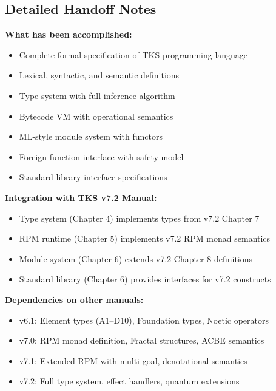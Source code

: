 \subsection{Detailed Handoff Notes}
\label{subsec:handoff-notes}

\begin{tcolorbox}[colback=yellow!5!white,colframe=yellow!50!black,title=\textbf{Handoff: TKS v7.3 Compiler Track Complete},breakable]

\textbf{What has been accomplished:}
\begin{itemize}
  \item Complete formal specification of TKS programming language
  \item Lexical, syntactic, and semantic definitions
  \item Type system with full inference algorithm
  \item Bytecode VM with operational semantics
  \item ML-style module system with functors
  \item Foreign function interface with safety model
  \item Standard library interface specifications
\end{itemize}

\textbf{Integration with TKS v7.2 Manual:}
\begin{itemize}
  \item Type system (Chapter 4) implements types from v7.2 Chapter 7
  \item RPM runtime (Chapter 5) implements v7.2 RPM monad semantics
  \item Module system (Chapter 6) extends v7.2 Chapter 8 definitions
  \item Standard library (Chapter 6) provides interfaces for v7.2 constructs
\end{itemize}

\textbf{Dependencies on other manuals:}
\begin{itemize}
  \item v6.1: Element types (A1--D10), Foundation types, Noetic operators
  \item v7.0: RPM monad definition, Fractal structures, ACBE semantics
  \item v7.1: Extended RPM with multi-goal, denotational semantics
  \item v7.2: Full type system, effect handlers, quantum extensions
\end{itemize}


\end{tcolorbox}
